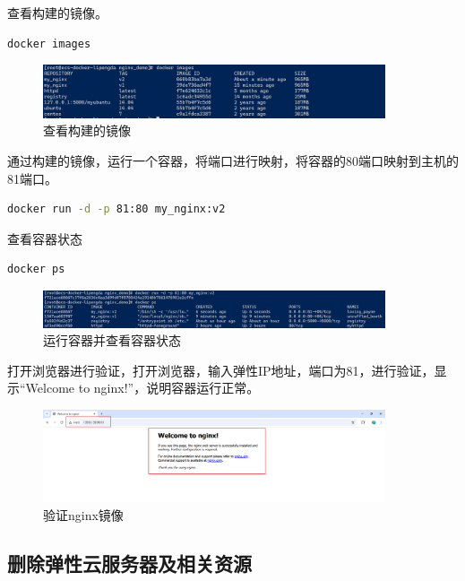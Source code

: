 \documentclass{article}
\begin{document}
查看构建的镜像。 

\begin{lstlisting}[language=bash]
    docker images
\end{lstlisting}

\begin{figure}[H]
\centering
\includegraphics[width=0.9\textwidth]{img/2.7.3.2.png}
\caption{查看构建的镜像}
\end{figure}

通过构建的镜像，运行一个容器，将端口进行映射，将容器的80端口映射到主机的81端口。

\begin{lstlisting}[language=bash]
    docker run -d -p 81:80 my_nginx:v2
\end{lstlisting}

查看容器状态

\begin{lstlisting}[language=bash]
    docker ps
\end{lstlisting}

\begin{figure}[H]
\centering
\includegraphics[width=0.9\textwidth]{img/2.7.3.3.png}
\caption{运行容器并查看容器状态}
\end{figure}

打开浏览器进行验证，打开浏览器，输入弹性IP地址，端口为81，进行验证，显示“Welcome to nginx!”，说明容器运行正常。

\begin{figure}[H]
\centering
\includegraphics[width=0.9\textwidth]{img/0.2.7.3.4.png}
\caption{验证nginx镜像}
\end{figure}

\subsection{删除弹性云服务器及相关资源}
\end{document}
